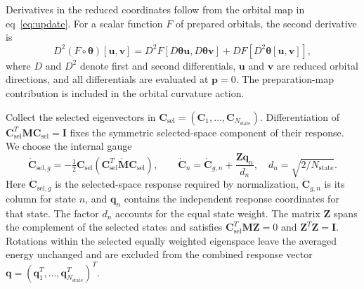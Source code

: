 \documentclass[12pt]{article}
\begin{document}
Derivatives in the reduced coordinates follow from the orbital map in eq~\eqref{eq:update}. For a scalar function \(F\) of prepared orbitals, the second derivative is
\begin{equation}
 D^2(F\circ\boldsymbol\theta)[\mathbf u,\mathbf v]
 =D^2F[D\boldsymbol\theta\mathbf u,D\boldsymbol\theta\mathbf v]
 +DF[D^2\boldsymbol\theta[\mathbf u,\mathbf v]],
 \label{eq:pullback}
\end{equation}
where \(D\) and \(D^2\) denote first and second differentials, \(\mathbf u\) and \(\mathbf v\) are reduced orbital directions, and all differentials are evaluated at \(\mathbf p=0\). The preparation-map contribution is included in the orbital curvature action.

Collect the selected eigenvectors in \(\mathbf C_{\mathrm{sel}}=(\mathbf C_1,\ldots,\mathbf C_{N_{\mathrm{state}}})\). Differentiation of \(\mathbf C_{\mathrm{sel}}^T\mathbf M\mathbf C_{\mathrm{sel}}=\mathbf I\) fixes the symmetric selected-space component of their response. We choose the internal gauge
\begin{equation}
 \dot{\mathbf C}_{\mathrm{sel},g}=-\tfrac12\mathbf C_{\mathrm{sel}}
 (\mathbf C_{\mathrm{sel}}^T\dot{\mathbf M}\mathbf C_{\mathrm{sel}}),\qquad
 \dot{\mathbf C}_n=\dot{\mathbf C}_{g,n}+\frac{\mathbf Z\mathbf q_n}{d_n},
 \quad d_n=\sqrt{2/N_{\mathrm{state}}}.
 \label{eq:structurechart}
\end{equation}
Here \(\dot{\mathbf C}_{\mathrm{sel},g}\) is the selected-space response required by normalization, \(\dot{\mathbf C}_{g,n}\) is its column for state \(n\), and \(\mathbf q_n\) contains the independent response coordinates for that state. The factor \(d_n\) accounts for the equal state weight. The matrix \(\mathbf Z\) spans the complement of the selected states and satisfies \(\mathbf C_{\mathrm{sel}}^T\mathbf M\mathbf Z=0\) and \(\mathbf Z^T\mathbf Z=\mathbf I\). Rotations within the selected equally weighted eigenspace leave the averaged energy unchanged and are excluded from the combined response vector \(\mathbf q=(\mathbf q_1^T,\ldots,\mathbf q_{N_{\mathrm{state}}}^T)^T\).
\end{document}
